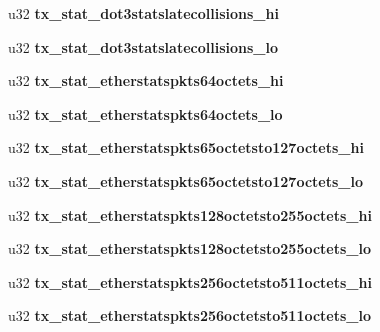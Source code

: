 \begin{DoxyCompactItemize}
\item 
\hypertarget{structmac__stx_a5858e3fe6d8f2e8cdfcc235946631d50}{
u32 {\bfseries tx\_\-stat\_\-dot3statslatecollisions\_\-hi}}
\label{structmac__stx_a5858e3fe6d8f2e8cdfcc235946631d50}

\item 
\hypertarget{structmac__stx_a0c86aaacbb5cbc687f22c5a0beddbeae}{
u32 {\bfseries tx\_\-stat\_\-dot3statslatecollisions\_\-lo}}
\label{structmac__stx_a0c86aaacbb5cbc687f22c5a0beddbeae}

\item 
\hypertarget{structmac__stx_a3d330229c58206182a20db839568a1c9}{
u32 {\bfseries tx\_\-stat\_\-etherstatspkts64octets\_\-hi}}
\label{structmac__stx_a3d330229c58206182a20db839568a1c9}

\item 
\hypertarget{structmac__stx_a13d2820c50067b2c6637ded8ac1ed9fc}{
u32 {\bfseries tx\_\-stat\_\-etherstatspkts64octets\_\-lo}}
\label{structmac__stx_a13d2820c50067b2c6637ded8ac1ed9fc}

\item 
\hypertarget{structmac__stx_a27aa3a82a45545ee68c0a38d552b533e}{
u32 {\bfseries tx\_\-stat\_\-etherstatspkts65octetsto127octets\_\-hi}}
\label{structmac__stx_a27aa3a82a45545ee68c0a38d552b533e}

\item 
\hypertarget{structmac__stx_abbd924063a2fb5f6cabb35eae6ad219f}{
u32 {\bfseries tx\_\-stat\_\-etherstatspkts65octetsto127octets\_\-lo}}
\label{structmac__stx_abbd924063a2fb5f6cabb35eae6ad219f}

\item 
\hypertarget{structmac__stx_a2670aa03814a12f336072ad1619d33ad}{
u32 {\bfseries tx\_\-stat\_\-etherstatspkts128octetsto255octets\_\-hi}}
\label{structmac__stx_a2670aa03814a12f336072ad1619d33ad}

\item 
\hypertarget{structmac__stx_ab775667df0aae4dd4b2b82560cc52379}{
u32 {\bfseries tx\_\-stat\_\-etherstatspkts128octetsto255octets\_\-lo}}
\label{structmac__stx_ab775667df0aae4dd4b2b82560cc52379}

\item 
\hypertarget{structmac__stx_a288e10dcb2d2086b2bf7fb65e87b8a90}{
u32 {\bfseries tx\_\-stat\_\-etherstatspkts256octetsto511octets\_\-hi}}
\label{structmac__stx_a288e10dcb2d2086b2bf7fb65e87b8a90}

\item 
\hypertarget{structmac__stx_a0a7f8e681d08e5991f44379cddee3608}{
u32 {\bfseries tx\_\-stat\_\-etherstatspkts256octetsto511octets\_\-lo}}
\label{structmac__stx_a0a7f8e681d08e5991f44379cddee3608}


\end{DoxyCompactItemize}
